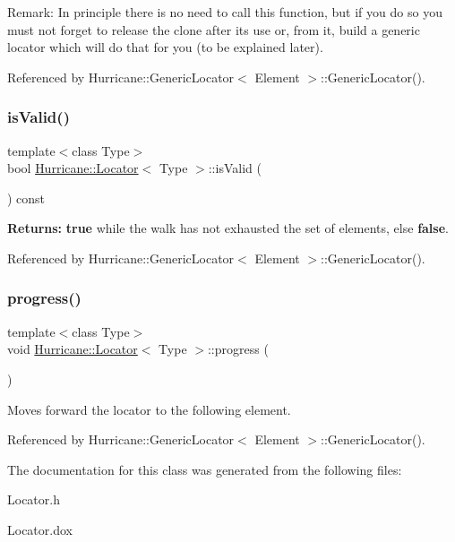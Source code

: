 \begin{DoxyParagraph}{Remark\+:}
In principle there is no need to call this function, but if you do so you must not forget to release the clone after its use or, from it, build a generic locator which will do that for you (to be explained later). 
\end{DoxyParagraph}


Referenced by Hurricane\+::\+Generic\+Locator$<$ Element $>$\+::\+Generic\+Locator().

\mbox{\label{classHurricane_1_1Locator_abb6e5255372e22e31bf0a8e4cae93f87}} 
\subsubsection{\texorpdfstring{is\+Valid()}{isValid()}}
{\footnotesize\ttfamily template$<$class Type$>$ \\
bool \hyperlink{classHurricane_1_1Locator}{Hurricane\+::\+Locator}$<$ Type $>$\+::is\+Valid (\begin{DoxyParamCaption}{ }\end{DoxyParamCaption}) const\hspace{0.3cm}{\ttfamily [pure virtual]}}

{\bfseries Returns\+:} {\bfseries true} while the walk has not exhausted the set of elements, else {\bfseries false}. 

Referenced by Hurricane\+::\+Generic\+Locator$<$ Element $>$\+::\+Generic\+Locator().

\mbox{\label{classHurricane_1_1Locator_ad8d72c1625a343a50520792c96fa1ca1}} 
\subsubsection{\texorpdfstring{progress()}{progress()}}
{\footnotesize\ttfamily template$<$class Type$>$ \\
void \hyperlink{classHurricane_1_1Locator}{Hurricane\+::\+Locator}$<$ Type $>$\+::progress (\begin{DoxyParamCaption}{ }\end{DoxyParamCaption})\hspace{0.3cm}{\ttfamily [pure virtual]}}

Moves forward the locator to the following element. 

Referenced by Hurricane\+::\+Generic\+Locator$<$ Element $>$\+::\+Generic\+Locator().



The documentation for this class was generated from the following files\+:\begin{DoxyCompactItemize}
\item 
Locator.\+h\item 
Locator.\+dox\end{DoxyCompactItemize}
